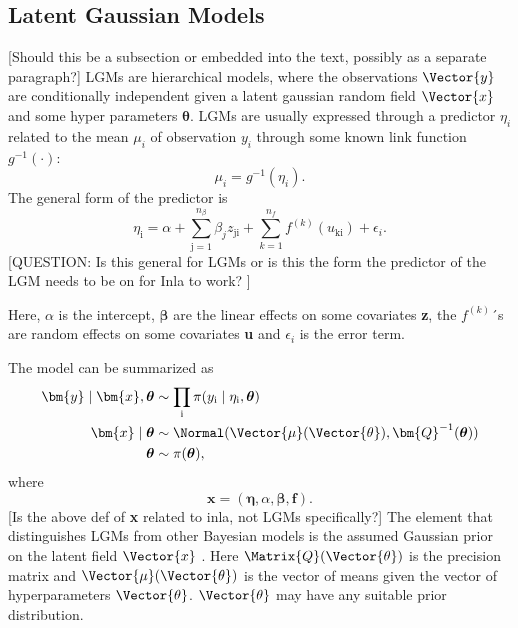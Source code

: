 \subsection{Latent Gaussian Models}
\label{sec:LGM}
[Should this be a subsection or embedded into the text, possibly as a separate paragraph?]
LGMs are hierarchical models, where the observations $\Vector{y}$ are conditionally independent given a latent gaussian random field $\Vector{x}$ and some hyper parameters $\boldsymbol{\theta}$.
LGMs are usually expressed through a predictor $\eta_i$ related to the mean $\mu_i$ of observation $y_i$ through some known link function $g^{-1}(\cdot)$:
\begin{equation}
    \mu_i = g^{-1}(\eta_i).
    \label{eq:LGMlinkFunction}
\end{equation}
The general form of the predictor is
\begin{equation}
    \eta_\text{i} = \alpha + \sum_{\text{j}=1}^{n_{\beta}}\beta_j z_{\text{ji}} + \sum_{k=1}^{n_f}f^{(k)}(u_{\text{ki}}) + \epsilon_{i}.
    \label{LGM-linear-predictor}
\end{equation}
\cite{rue2009inla}
[QUESTION: Is this general for LGMs or is this the form the predictor of the LGM needs to be on for Inla to work? ]

Here, $\alpha$ is the intercept, $\boldsymbol{\beta}$ are the linear effects on some covariates \textbf{z}, the $f^{(k)}$´s are random effects on some covariates \textbf{u} and $\epsilon_i$ is the error term. 

\noindent The model can be summarized as 
\begin{equation}
    \begin{aligned}
    \bm{y}\mid \bm{x}, \boldsymbol{\theta} &\sim \prod_{\text{i}} \pi (y_{\text{i}} \mid \eta_{\text{i}}, \boldsymbol{\theta})\\
    \bm{x} \mid \boldsymbol{\theta} &\sim \Normal(\Vector{\mu}(\Vector{\theta}), \bm{Q}^{-1}(\boldsymbol{\theta})) \\
    \boldsymbol{\theta} &\sim \pi(\boldsymbol{\theta}),
    \end{aligned}
    \label{LGM-model-summarized}
\end{equation}
where
\begin{equation}
    \bm{x} = (\boldsymbol{\eta}, \alpha, \boldsymbol{\beta}, \boldsymbol{f}).
    \label{LGM-latent-field}
\end{equation}
[Is the above def of \textbf{x} related to inla, not LGMs specifically?]
The element that distinguishes LGMs from other Bayesian models is the assumed Gaussian prior on the latent field $\Vector{x}$ \cite{rue2009inla}. Here $\Matrix{Q}(\Vector{\theta})$ is the precision matrix and $\Vector{\mu}(\Vector{\theta})$ is the vector of means given the vector of hyperparameters $\Vector{\theta}$. $\Vector{\theta}$ may have any suitable prior distribution. 
